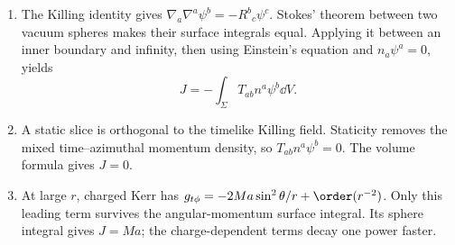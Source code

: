 \begin{enumerate}[leftmargin=2.8em,itemsep=1.2em]
\begin{enumerate}[label=\alph*),leftmargin=2em]
\item The Killing identity gives
\(\nabla_a\nabla^a\psi^b=-R^b{}_c\psi^c\).  Stokes' theorem between two
vacuum spheres makes their surface integrals equal.  Applying it between an
inner boundary and infinity, then using Einstein's equation and
\(n_a\psi^a=0\), yields
\[
 J=-\int_\Sigma T_{ab}n^a\psi^b\dd V.
\]

\item A static slice is orthogonal to the timelike Killing field.  Staticity
removes the mixed time--azimuthal momentum density, so
\(T_{ab}n^a\psi^b=0\).  The volume formula gives \(J=0\).

\item At large \(r\), charged Kerr has
\(g_{t\phi}=-2Ma\sin^2\theta/r+\order(r^{-2})\).  Only this leading term
survives the angular-momentum surface integral.  Its sphere integral gives
\(J=Ma\); the charge-dependent terms decay one power faster.
\end{enumerate}
\end{enumerate}

